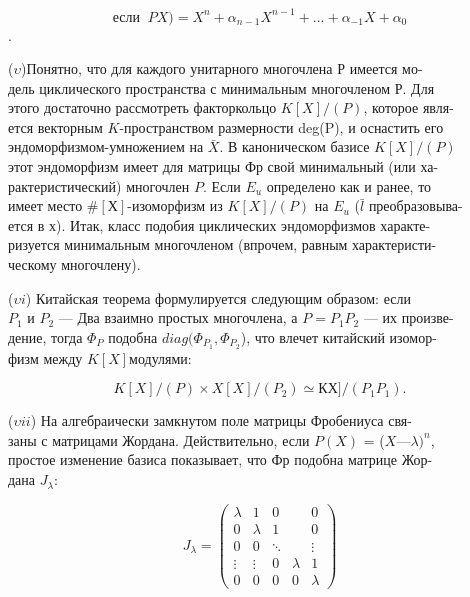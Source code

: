 \documentclass{../template/mai_book}
\begin{document}
$$\text{если} \;\;PX) = X^n+\alpha_{n-1}X^{n-1}+... +\alpha_{-1}X+\alpha_0$$.

\pagebreak

($\upsilon$)Понятно, что для каждого унитарного многочлена Р имеется 
мо-\\дель циклического пространства с минимальным многочленом Р. Для\\ 
этого достаточно рассмотреть факторкольцо $K[X]/(P)$, которое 
явля-\\ется векторным $\mathit{K}$-пространством размерности deg(P), и оснастить его \\эндоморфизмом-умножением на $\bar{X}$. В каноническом базисе $K[X]/(P)$\\
этот эндоморфизм имеет для матрицы Фр свой минимальный (или 
ха-\\рактеристический) многочлен $P$. Если $E_u$ определено как и ранее, то\\ 
имеет место $\# [Х]$-изоморфизм из $K[X]/(P)$ на $E_u$ ($\bar{l}$ 
преобразовыва-\\ется в х). Итак, класс подобия циклических эндоморфизмов 
характе-\\ризуется минимальным многочленом (впрочем, равным 
характеристи-\\ческому многочлену).

\medskip

($\upsilon\mathit {i} $) Китайская теорема формулируется следующим образом: если\\ $P_1$ и $P_2$ — Два взаимно простых многочлена, а $P=P_1P_2$ — их произве-\\дение, тогда $ \Phi_P$ подобна $diag( \Phi_{P_1},\Phi_{P_2}$), что влечет китайский изомор-\\физм между $K[X]$модулями: 

\medskip

$$K[X]/(P) \times X[X]/(P_2) \simeq КХ]/(P_1P_1).$$ 

\medskip

($\upsilon\mathit{ii} $) На алгебраически замкнутом поле матрицы Фробениуса свя-\\заны с матрицами Жордана. Действительно, если $P(X)$ = ($X — \lambda)^n$,\\простое изменение базиса показывает, что Фр подобна матрице 
Жор-\\дана $J_{\lambda}$:

$$J_{\lambda} = \begin{pmatrix}
\lambda & 1 & 0 & \; & 0 \\
0 & \lambda & 1 & \; & 0 \\
0 & 0 & \ddots & \; & \vdots \\
\vdots & \vdots & 0 & \lambda & 1 \\
0 & 0 & 0 & 0 & \lambda
\end{pmatrix}
$$
\end{document}
